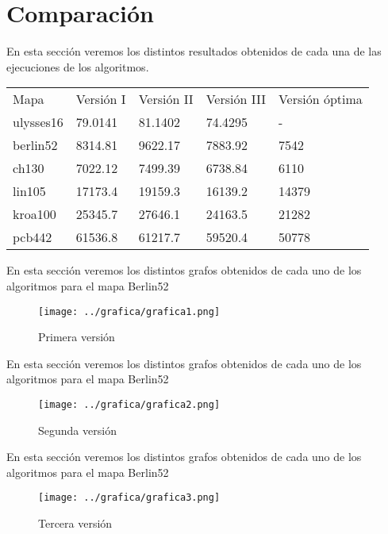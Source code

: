 	\section{Comparación}

		En esta sección veremos los distintos resultados obtenidos de cada una de las ejecuciones de los algoritmos.
		
		\begin{table}[H]
			\centering
			
			
			\begin{tabular}{l|l|l|l|l}
				Mapa & Versión I & Versión II & Versión III  & Versión óptima  \\
				ulysses16 & 79.0141 & 81.1402 & 74.4295 & - \\
				berlin52 & 8314.81 & 9622.17 & 7883.92 & 7542  \\
				ch130 & 7022.12 & 7499.39 & 6738.84 & 6110 \\
				lin105 & 17173.4 & 19159.3 & 16139.2 & 14379 \\
				kroa100	& 25345.7 & 27646.1 & 24163.5 & 21282 \\
				pcb442 & 61536.8 & 61217.7 & 59520.4 & 50778 \\
			\end{tabular}
			
		\end{table}
		

		En esta sección veremos los distintos grafos obtenidos de cada uno de los algoritmos para el mapa Berlin52
		
		\begin{figure}
			\centering
			\texttt{[image: ../grafica/grafica1.png]}
			\caption{Primera versión}
			\label{fig:graficafinal}
		\end{figure}
		

		En esta sección veremos los distintos grafos obtenidos de cada uno de los algoritmos para el mapa Berlin52
		
		\begin{figure}
			\centering
			\texttt{[image: ../grafica/grafica2.png]}
			\caption{Segunda versión}
			\label{fig:graficafinal}
		\end{figure}
		
		
		

		En esta sección veremos los distintos grafos obtenidos de cada uno de los algoritmos para el mapa Berlin52
		
		\begin{figure}
			\centering
			\texttt{[image: ../grafica/grafica3.png]}
			\caption{Tercera versión}
			\label{fig:graficafinal}
		\end{figure}
		
		
	
	
	
	
 